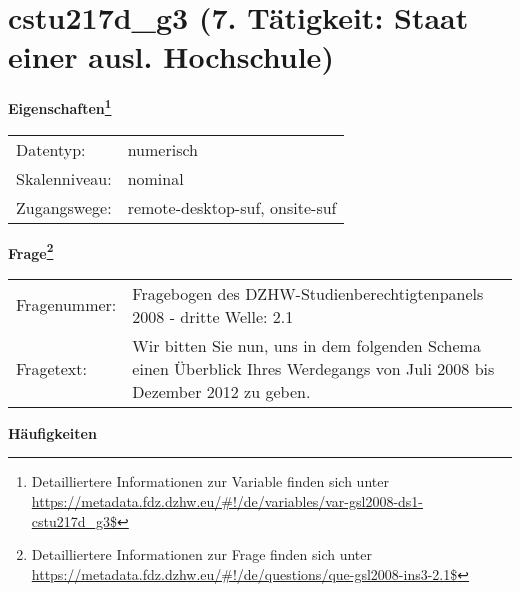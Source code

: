 
    \setcounter{footnote}{0}

    \vspace*{-1.8cm}
	\section{cstu217d\_g3 (7. Tätigkeit: Staat einer ausl. Hochschule)}
	\label{section:cstu217d_g3}



    \vspace*{0.5cm}
    \noindent\textbf{Eigenschaften\footnote{Detailliertere Informationen zur Variable finden sich unter
		\url{https://metadata.fdz.dzhw.eu/\#!/de/variables/var-gsl2008-ds1-cstu217d_g3$}}}\\
	\begin{tabularx}{\hsize}{@{}lX}
	Datentyp: & numerisch \\
	Skalenniveau: & nominal \\
	Zugangswege: &
	  remote-desktop-suf, 
	  onsite-suf
 \\
    \end{tabularx}



				\vspace*{0.5cm}
                \noindent\textbf{Frage\footnote{Detailliertere Informationen zur Frage finden sich unter
		              \url{https://metadata.fdz.dzhw.eu/\#!/de/questions/que-gsl2008-ins3-2.1$}}}\\
				\begin{tabularx}{\hsize}{@{}lX}
					Fragenummer: &
					  Fragebogen des DZHW-Studienberechtigtenpanels 2008 - dritte Welle:
					  2.1
 \\
					Fragetext: & Wir bitten Sie nun, uns in dem folgenden Schema einen Überblick Ihres Werdegangs von Juli 2008 bis Dezember 2012 zu geben. \\
				\end{tabularx}





        		\vspace*{0.5cm}
                \noindent\textbf{Häufigkeiten}

